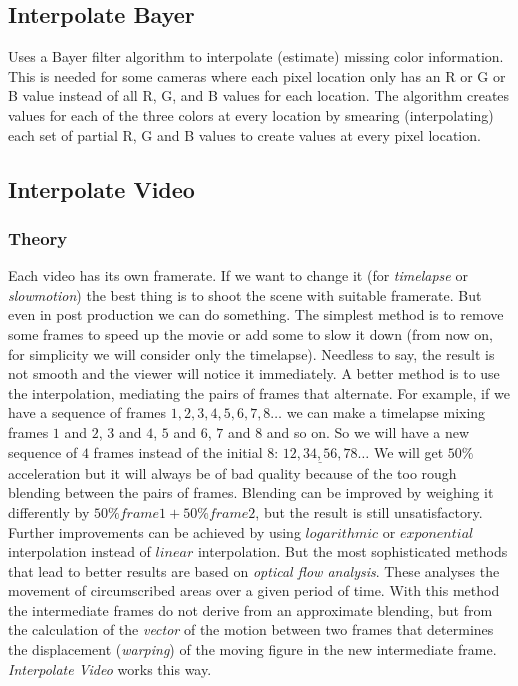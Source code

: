 \subsection{Interpolate Bayer}%
\label{sub:interpolate_bayer}

Uses a Bayer filter algorithm to interpolate (estimate) missing color information. This is needed for some cameras where each pixel location only has an R or G or B value instead of all R, G, and B values for each location. The algorithm creates values for each of the three colors at every location by smearing (interpolating) each set of partial R, G and B values to create values at every pixel location.

\subsection{Interpolate Video}%
\label{sub:interpolate_video}

\subsubsection*{Theory}
\label{ssub:theory}

Each video has its own framerate. If we want to change it (for \textit{timelapse} or \textit{slowmotion}) the best thing is to shoot the scene with suitable framerate. But even in post production we can do something. The simplest method is to remove some frames to speed up the movie or add some to slow it down (from now on, for simplicity we will consider only the timelapse). Needless to say, the result is not smooth and the viewer will notice it immediately. A better method is to use the interpolation, mediating the pairs of frames that alternate. For example, if we have a sequence of frames $1, 2, 3, 4, 5, 6, 7, 8\dots$ we can make a timelapse mixing frames $1$ and $2$, $3$ and $4$, $5$ and $6$, $7$ and $8$ and so on. So we will have a new sequence of $4$ frames instead of the initial $8$: $\underline{12, 34, 56, 78}\dots$ We will get $50\%$ acceleration but it will always be of bad quality because of the too rough blending between the pairs of frames. Blending can be improved by weighing it differently by $50\% frame 1 + 50\% frame 2$, but the result is still unsatisfactory. Further improvements can be achieved by using $logarithmic$ or $exponential$ interpolation instead of $linear$ interpolation. But the most sophisticated methods that lead to better results are based on \textit{optical flow analysis}. These analyses the movement of circumscribed areas over a given period of time. With this method the intermediate frames do not derive from an approximate blending, but from the calculation of the \textit{vector} of the motion between two frames that determines the displacement (\textit{warping}) of the moving figure in the new intermediate frame. \textit{Interpolate Video} works this way.

